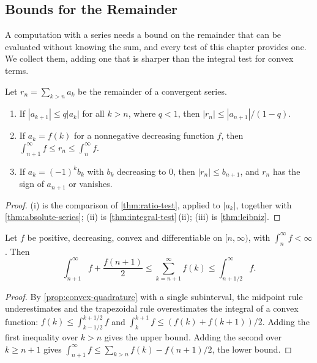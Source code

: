 \subsection{Bounds for the Remainder}

A computation with a series needs a bound on the remainder that can be evaluated without knowing the sum, and every test of this chapter provides one. We collect them, adding one that is sharper than the integral test for convex terms.

\begin{proposition}
\label{prop:tail-bounds}
Let $r_n=\sum_{k>n}a_k$ be the remainder of a convergent series.
\begin{enumerate}
\item If $|a_{k+1}|\le q|a_k|$ for all $k>n$, where $q<1$, then $|r_n|\le|a_{n+1}|/(1-q)$.
\item If $a_k=f(k)$ for a nonnegative decreasing function $f$, then $\int_{n+1}^\infty f\le r_n\le\int_n^\infty f$.
\item If $a_k=(-1)^kb_k$ with $b_k$ decreasing to $0$, then $|r_n|\le b_{n+1}$, and $r_n$ has the sign of $a_{n+1}$ or vanishes.
\end{enumerate}
\end{proposition}

\begin{proof}
(i) is the comparison of \cref{thm:ratio-test}, applied to $|a_k|$, together with \cref{thm:absolute-series}; (ii) is \cref{thm:integral-test}\,(ii); (iii) is \cref{thm:leibniz}.
\end{proof}

\begin{proposition}
\label{prop:convex-tail}
Let $f$ be positive, decreasing, convex and differentiable on $[n,\infty)$, with $\int_n^\infty f<\infty$. Then
\[
\int_{n+1}^\infty f+\frac{f(n+1)}2\le\sum_{k=n+1}^\infty f(k)\le\int_{n+1/2}^\infty f .
\]
\end{proposition}

\begin{proof}
By \cref{prop:convex-quadrature} with a single subinterval, the midpoint rule underestimates and the trapezoidal rule overestimates the integral of a convex function: $f(k)\le\int_{k-1/2}^{k+1/2}f$ and $\int_k^{k+1}f\le(f(k)+f(k+1))/2$. Adding the first inequality over $k>n$ gives the upper bound. Adding the second over $k\ge n+1$ gives $\int_{n+1}^\infty f\le\sum_{k>n}f(k)-f(n+1)/2$, the lower bound.
\end{proof}

